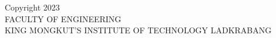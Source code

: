 \mbox{}
\vfill

\begin{flushleft}
Copyright 2023\\
FACULTY OF ENGINEERING\\
KING MONGKUT’S INSTITUTE OF TECHNOLOGY LADKRABANG
\end{flushleft}

